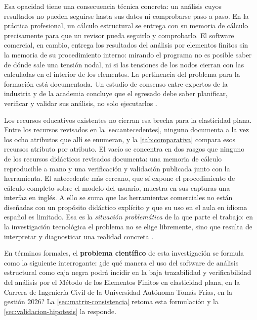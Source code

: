 Esa opacidad tiene una consecuencia técnica concreta: un análisis cuyos resultados no pueden seguirse hasta sus datos ni comprobarse paso a paso. En la práctica profesional, un cálculo estructural se entrega con su memoria de cálculo precisamente para que un revisor pueda seguirlo y comprobarlo. El software comercial, en cambio, entrega los resultados del análisis por elementos finitos sin la memoria de su procedimiento interno: mirando el programa no es posible saber de dónde sale una tensión nodal, ni si las tensiones de los nodos cierran con las calculadas en el interior de los elementos. La pertinencia del problema para la formación está documentada. Un estudio de consenso entre expertos de la industria y de la academia concluye que el egresado debe saber planificar, verificar y validar sus análisis, no solo ejecutarlos \autocite[pp.~1159, 1171]{perezsantiago2023fem}.

Los recursos educativos existentes no cierran esa brecha para la elasticidad plana. Entre los recursos revisados en la \autoref{sec:antecedentes}, ninguno documenta a la vez los ocho atributos que allí se enumeran, y la \autoref{tab:comparativa} compara esos recursos atributo por atributo. El vacío se concentra en dos rasgos que ninguno de los recursos didácticos revisados documenta: una memoria de cálculo reproducible a mano y una verificación y validación publicada junto con la herramienta. El antecedente más cercano, que sí expone el procedimiento de cálculo completo sobre el modelo del usuario, muestra en sus capturas una interfaz en inglés. A ello se suma que las herramientas comerciales no están diseñadas con un propósito didáctico explícito \autocite[p.~1160]{perezsantiago2023fem} y que su uso en el aula en idioma español es limitado. Esa es la \emph{situación problemática} de la que parte el trabajo: en la investigación tecnológica el problema no se elige libremente, sino que resulta de interpretar y diagnosticar una realidad concreta \autocite[p.~83]{garciacordoba2005tecnologica}.

En términos formales, el \textbf{problema científico} de esta investigación se formula como la siguiente interrogante: ¿de qué manera el uso del software de análisis estructural como caja negra podrá incidir en la baja trazabilidad y verificabilidad del análisis por el Método de los Elementos Finitos en elasticidad plana, en la Carrera de Ingeniería Civil de la Universidad Autónoma Tomás Frías, en la gestión 2026? La \autoref{sec:matriz-consistencia} retoma esta formulación y la \autoref{sec:validacion-hipotesis} la responde.

